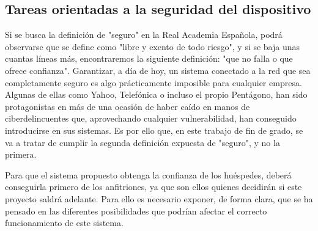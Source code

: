 \subsection{Tareas orientadas a la seguridad del dispositivo}
Si se busca la definición de "seguro" en la Real Academia Española, podrá observarse que se define como "libre y exento de todo riesgo", y si se baja unas cuantas líneas más, encontraremos la siguiente definición: "que no falla o que ofrece confianza".
Garantizar, a día de hoy, un sistema conectado a la red que sea completamente seguro es algo prácticamente imposible para cualquier empresa. Algunas de ellas \cite{redaccionapd2018} como Yahoo, Telefónica o incluso el propio Pentágono, han sido protagonistas en más de una ocasión de haber caído en manos de ciberdelincuentes que, aprovechando cualquier vulnerabilidad, han conseguido introducirse en sus sistemas. Es por ello que, en este trabajo de fin de grado, se va a tratar de cumplir la segunda definición expuesta de "seguro", y no la primera.

Para que el sistema propuesto obtenga la confianza de los huéspedes, deberá conseguirla primero de los anfitriones, ya que son ellos quienes decidirán si este proyecto saldrá adelante. Para ello es necesario exponer, de forma clara, que se ha pensado en las diferentes posibilidades que podrían afectar el correcto funcionamiento de este sistema. 

